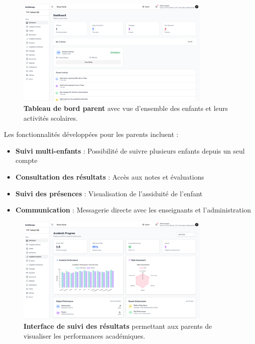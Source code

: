 \begin{figure}[H]
  \centering
  \includegraphics[width=0.85\textwidth,keepaspectratio]{pfe-pics/parent/Screenshot 2025-06-09 at 22-57-22 Vite React TS.png}
  \caption{\textbf{Tableau de bord parent} avec vue d'ensemble des enfants et leurs activités scolaires.}
  \label{fig:parent_dashboard}
\end{figure}

Les fonctionnalités développées pour les parents incluent :

\begin{itemize}
  \item \textbf{Suivi multi-enfants} : Possibilité de suivre plusieurs enfants depuis un seul compte
  
  \item \textbf{Consultation des résultats} : Accès aux notes et évaluations
  
  \item \textbf{Suivi des présences} : Visualisation de l'assiduité de l'enfant
  
  \item \textbf{Communication} : Messagerie directe avec les enseignants et l'administration
\end{itemize}

\begin{figure}[H]
  \centering
  \includegraphics[width=0.85\textwidth,keepaspectratio]{pfe-pics/parent/Screenshot 2025-06-09 at 22-58-13 Vite React TS.png}
  \caption{\textbf{Interface de suivi des résultats} permettant aux parents de visualiser les performances académiques.}
  \label{fig:grades_view}
\end{figure}

